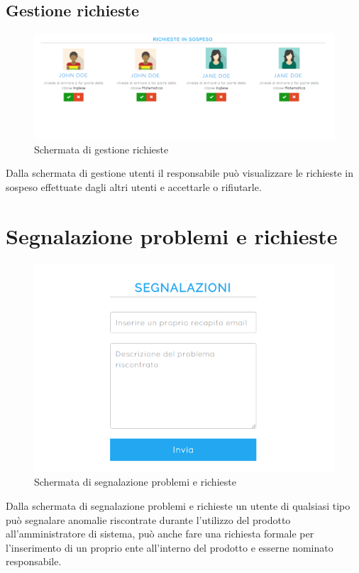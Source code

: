 \documentclass[a4paper, titlepage]{article}
\begin{document}
	 \subsection{Gestione richieste}
	 \begin{figure}[!h]
	 	\centering
	 	\includegraphics[scale=0.33]{Img/screen_GestioneRichieste.png}
	 	\caption{Schermata di gestione richieste}
	 \end{figure}
	 Dalla schermata di gestione utenti il responsabile può visualizzare le richieste in sospeso effettuate dagli altri utenti e accettarle o rifiutarle.
	 
	 \newpage
	 \section{Segnalazione problemi e richieste}
	 \begin{figure}[!h]
	 	\centering
	 	\includegraphics[scale=0.33]{Img/screen_Segnalazioni.png}
	 	\caption{Schermata di segnalazione problemi e richieste}
	 \end{figure}
	 Dalla schermata di segnalazione problemi e richieste un utente di qualsiasi tipo può segnalare anomalie riscontrate durante l'utilizzo del prodotto all'amministratore di sistema, può anche fare una richiesta formale per l'inserimento di un proprio ente all'interno del prodotto e esserne nominato responsabile.
	 
\end{document}
